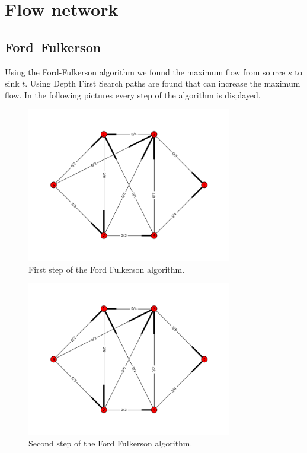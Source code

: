 \documentclass[a4paper,12px]{article}
\begin{document}
\section{Flow network}
\subsection{Ford–Fulkerson}

Using the Ford-Fulkerson algorithm we found the maximum flow from source $s$ to
sink $t$. Using Depth First Search paths are found that can increase the maximum
flow. In the following pictures every step of the algorithm is displayed.

\begin{figure}[H]
    \includegraphics[width=0.8\textwidth]{figure1a_a.png}
    \caption{First step of the Ford Fulkerson algorithm.}
\end{figure}
\begin{figure}[H]
    \includegraphics[width=0.8\textwidth]{figure1a_b.png}
    \caption{Second step of the Ford Fulkerson algorithm.}
\end{figure}
\end{document}
